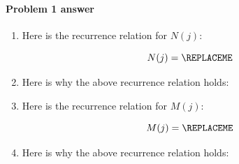 \paragraph{Problem 1 answer}


\begin{enumerate}[label=(\alph*)]

\item[(a)] %
  Here is the recurrence relation for $N(j)$: 

  \begin{blue}
    \[
      N(j) = \REPLACEME
    \]
  \end{blue}
  

\item[(b)]  %
  Here is why the above recurrence relation holds:

  \begin{blue}
    \REPLACEME
  \end{blue}
  
\item[(c)] %
  Here is the recurrence relation for $M(j)$:

  \begin{blue}
    \[
      M(j) = \REPLACEME
    \]
  \end{blue}


\item[(d)]  %
  Here is why the above recurrence relation holds:

  \begin{blue}
    \REPLACEME
  \end{blue}
  
\end{enumerate}

